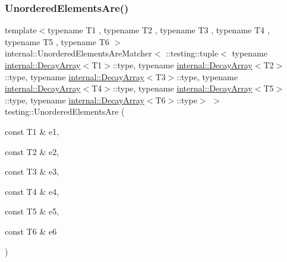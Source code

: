 \subsubsection{\texorpdfstring{UnorderedElementsAre()}{UnorderedElementsAre()}\hspace{0.1cm}{\footnotesize\ttfamily [7/11]}}
{\footnotesize\ttfamily template$<$typename T1 , typename T2 , typename T3 , typename T4 , typename T5 , typename T6 $>$ \\
internal\+::\+Unordered\+Elements\+Are\+Matcher$<$ \+::testing\+::tuple$<$ typename \mbox{\hyperlink{structtesting_1_1internal_1_1DecayArray}{internal\+::\+Decay\+Array}}$<$T1$>$\+::type, typename \mbox{\hyperlink{structtesting_1_1internal_1_1DecayArray}{internal\+::\+Decay\+Array}}$<$T2$>$\+::type, typename \mbox{\hyperlink{structtesting_1_1internal_1_1DecayArray}{internal\+::\+Decay\+Array}}$<$T3$>$\+::type, typename \mbox{\hyperlink{structtesting_1_1internal_1_1DecayArray}{internal\+::\+Decay\+Array}}$<$T4$>$\+::type, typename \mbox{\hyperlink{structtesting_1_1internal_1_1DecayArray}{internal\+::\+Decay\+Array}}$<$T5$>$\+::type, typename \mbox{\hyperlink{structtesting_1_1internal_1_1DecayArray}{internal\+::\+Decay\+Array}}$<$T6$>$\+::type$>$ $>$ testing\+::\+Unordered\+Elements\+Are (\begin{DoxyParamCaption}\item[{const T1 \&}]{e1,  }\item[{const T2 \&}]{e2,  }\item[{const T3 \&}]{e3,  }\item[{const T4 \&}]{e4,  }\item[{const T5 \&}]{e5,  }\item[{const T6 \&}]{e6 }\end{DoxyParamCaption})\hspace{0.3cm}{\ttfamily [inline]}}

\mbox{\label{namespacetesting_add6e16fe24c45e39e92c0d19c04acf11}} 
